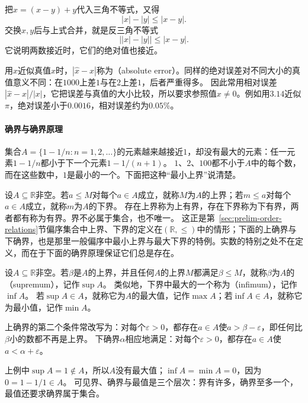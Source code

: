 把$x=(x-y)+y$代入三角不等式，又得
\[
 |x|-|y|\leq|x-y|.
\]
交换$x,y$后与上式合并，就是反三角不等式
\[
 \bigl||x|-|y|\bigr|\leq|x-y|.
\]
它说明两数接近时，它们的绝对值也接近。

用$\hat x$近似真值$x$时，$|\hat x-x|$称为（absolute error）。同样的绝对误差对不同大小的真值意义不同：在$1000$上差$1$与在$2$上差$1$，后者严重得多。
因此常用相对误差$|\hat x-x|/|x|$，它把误差与真值的大小比较，所以要求参照值$x\neq0$。例如用$3.14$近似$\pi$，绝对误差小于$0.0016$，相对误差约为$0.05\%$。

\paragraph{确界与确界原理}
\label{sec:ru-supremum-completeness}
集合$A=\{1-1/n:n=1,2,\ldots\}$的元素越来越接近$1$，却没有最大的元素：任一元素$1-1/n$都小于下一个元素$1-1/(n+1)$。
$1$、$2$、$100$都不小于$A$中的每个数，而在这些数中，$1$是最小的一个。下面把这种“最小上界”说清楚。

设$A\subseteq\mathbb R$非空。若$a\leq M$对每个$a\in A$成立，就称$M$为$A$的上界；若$m\leq a$对每个$a\in A$成立，就称$m$为$A$的下界。
存在上界称为上有界，存在下界称为下有界，两者都有称为有界。界不必属于集合，也不唯一。
这正是第~\ref{sec:prelim-order-relations}节偏序集合中上界、下界的定义在$(\mathbb R,\leq)$中的情形；下面的上确界与下确界，也是那里一般偏序中最小上界与最大下界的特例。实数的特别之处不在定义，而在于下面的确界原理保证它们总是存在。

\begin{definition}[上确界与下确界]
\label{def:ru-supremum}
设$A\subseteq\mathbb R$非空。若$\beta$是$A$的上界，并且任何$A$的上界$M$都满足$\beta\leq M$，就称$\beta$为$A$的（supremum），记作$\sup A$。
类似地，下界中最大的一个称为（infimum），记作$\inf A$。
若$\sup A\in A$，就称它为$A$的最大值，记作$\max A$；若$\inf A\in A$，就称它为最小值，记作$\min A$。
\end{definition}

上确界的第二个条件常改写为：对每个$\varepsilon>0$，都存在$a\in A$使$a>\beta-\varepsilon$，即任何比$\beta$小的数都不再是上界。
下确界$\alpha$相应地满足：对每个$\varepsilon>0$，都存在$a\in A$使$a<\alpha+\varepsilon$。

上例中$\sup A=1\notin A$，所以$A$没有最大值；$\inf A=\min A=0$，因为$0=1-1/1\in A$。
可见界、确界与最值是三个层次：界有许多，确界至多一个，最值还要求确界属于集合。

